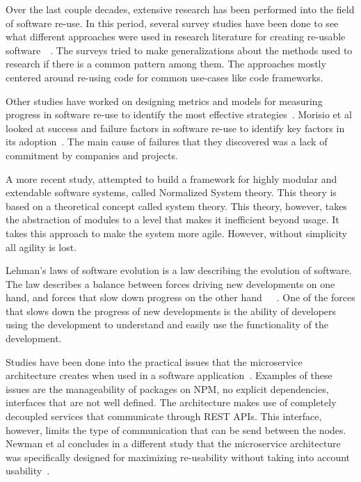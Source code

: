 Over the last couple decades, extensive research has been performed into the field of software re-use. In this period, several survey studies have been done to see what different approaches were used in research literature for creating re-usable software~\cite{krueger1992software}~\cite{frakes2005software}. The surveys tried to make generalizations about the methods used to research if there is a common pattern among them. The approaches mostly centered around re-using code for common use-cases like code frameworks. 

Other studies have worked on designing metrics and models for measuring progress in software re-use to identify the most effective strategies~\cite{frakes1996software}. Morisio et al looked at success and failure factors in software re-use to identify key factors in its adoption~\cite{morisio2002success}. The main cause of failures that they discovered was a lack of commitment by companies and projects.


A more recent study, attempted to build a framework for highly modular and extendable software systems, called Normalized System theory. This theory is based on a theoretical concept called system theory. This theory, however, takes the abstraction of modules to a level that makes it inefficient beyond usage. It takes this approach to make the system more agile. However, without simplicity all agility is lost. ~\cite{de2018enabling}

Lehman's laws of software evolution is a law describing the evolution of software. The law describes a balance between forces driving new developments on one hand, and forces that slow down progress on the other hand~\cite{lehman1980programs}~\cite{lehman1997metrics}~\cite{herraiz2013evolution}. One of the forces that slows down the progress of new developments is the ability of developers using the development to understand and easily use the functionality of the development.


 Studies have been done into the practical issues that the microservice architecture creates when used in a software application~\cite{dragoni2017microservices}. Examples of these issues are the manageability of packages on NPM, no explicit dependencies, interfaces that are not well defined. The architecture makes use of completely decoupled services that communicate through REST APIs. This interface, however, limits the type of communication that can be send between the nodes. Newman et al concludes in a different study that the microservice architecture was specifically designed for maximizing re-usability without taking into account usability~\cite{newman2015building}.

